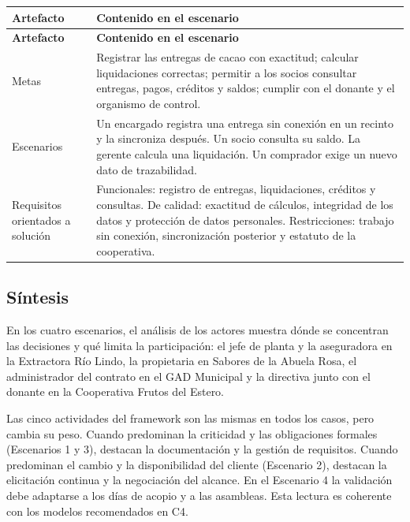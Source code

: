{\small
\setlength{\tabcolsep}{4pt}
\renewcommand{\arraystretch}{1.3}
\begin{longtable}{
|>{\raggedright\arraybackslash}p{}
|>{\raggedright\arraybackslash}p{}|}
\hline
\textbf{Artefacto} & \textbf{Contenido en el escenario} \\
\hline
\endfirsthead
\hline
\textbf{Artefacto} & \textbf{Contenido en el escenario} \\
\hline
\endhead
Metas & Registrar las entregas de cacao con exactitud; calcular liquidaciones correctas; permitir a los socios consultar entregas, pagos, créditos y saldos; cumplir con el donante y el organismo de control. \\
\hline
Escenarios & Un encargado registra una entrega sin conexión en un recinto y la sincroniza después. Un socio consulta su saldo. La gerente calcula una liquidación. Un comprador exige un nuevo dato de trazabilidad. \\
\hline
Requisitos orientados a solución & Funcionales: registro de entregas, liquidaciones, créditos y consultas. De calidad: exactitud de cálculos, integridad de los datos y protección de datos personales. Restricciones: trabajo sin conexión, sincronización posterior y estatuto de la cooperativa. \\
\hline
\end{longtable}
}

\subsection{Síntesis}

En los cuatro escenarios, el análisis de los actores muestra dónde se concentran las decisiones y qué limita la participación: el jefe de planta y la aseguradora en la Extractora Río Lindo, la propietaria en Sabores de la Abuela Rosa, el administrador del contrato en el GAD Municipal y la directiva junto con el donante en la Cooperativa Frutos del Estero.

Las cinco actividades del framework son las mismas en todos los casos, pero cambia su peso. Cuando predominan la criticidad y las obligaciones formales (Escenarios 1 y 3), destacan la documentación y la gestión de requisitos. Cuando predominan el cambio y la disponibilidad del cliente (Escenario 2), destacan la elicitación continua y la negociación del alcance. En el Escenario 4 la validación debe adaptarse a los días de acopio y a las asambleas. Esta lectura es coherente con los modelos recomendados en C4.
